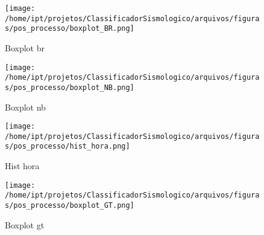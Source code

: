                     \begin{figure}[H]
                        \centering
                        \texttt{[image: /home/ipt/projetos/ClassificadorSismologico/arquivos/figuras/pos\_processo/boxplot\_BR.png]}
                        \caption{Boxplot br}
                        \label{fig:boxplot_BR}
                    \end{figure}
                

                    \begin{figure}[H]
                        \centering
                        \texttt{[image: /home/ipt/projetos/ClassificadorSismologico/arquivos/figuras/pos\_processo/boxplot\_NB.png]}
                        \caption{Boxplot nb}
                        \label{fig:boxplot_NB}
                    \end{figure}
                

                    \begin{figure}[H]
                        \centering
                        \texttt{[image: /home/ipt/projetos/ClassificadorSismologico/arquivos/figuras/pos\_processo/hist\_hora.png]}
                        \caption{Hist hora}
                        \label{fig:hist_hora}
                    \end{figure}
                

                    \begin{figure}[H]
                        \centering
                        \texttt{[image: /home/ipt/projetos/ClassificadorSismologico/arquivos/figuras/pos\_processo/boxplot\_GT.png]}
                        \caption{Boxplot gt}
                        \label{fig:boxplot_GT}
                    \end{figure}
                
